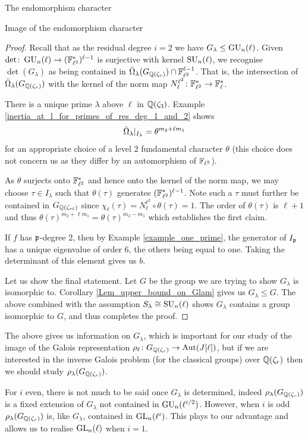 \documentclass[11pt,a4paper]{article}
\newcommand{\Fl}{\mathbb{F}_\ell}
\newcommand{\Qr}{{\QQ(\zeta_r)}}
\newcommand{\GQr}{G_{\QQ(\zeta_{r})}}
\newcommand{\GQrl}{G_{\QQ(\zeta_{r\ell})}}
\newcommand{\Glam}{G_{\lambda}}
\newcommand{\Slam}{S_{\lambda}}
\begin{document}
\begin{section}{The endomorphism character}
\begin{subsection}{Image of the endomorphism character}
\begin{proof}
Recall that as the residual degree $i=2$ we have $\Glam \leq \GU_{n}(\ell)$.
Given $\det \colon \GU_{n}(\ell) \rightarrow (\FF_{\ell^2}^*)^{\ell-1}$ is surjective with kernel $\SU_n(\ell)$, we recognise $\det(\Glam)$ as being contained in $\Bar{\Omega}_\lambda(\GQr)\cap \FF_{\ell^2}^{\ell-1}$.
That is, the intersection of $\Bar{\Omega}_\lambda(\GQr)$ with the kernel of the norm map $N^{\ell^2}_\ell\colon \FF_{\ell^2}^* \rightarrow \Fl^*$.  

There is a unique prime $\lambda$ above $\ell$ in $\mathbb{Q}(\zeta_3)$. Example \ref{inertia_at_l_for_primes_of_res_deg_1_and_2} shows
\[
\Bar{\Omega}_\lambda|_{I_{\lambda}} = \theta^{m_{2} + \ell m_1 }
\]
for an appropriate choice of a level 2 fundamental character $\theta$ (this choice does not concern us as they differ by an automorphism of $\mathbb{F}_{\ell^2}$).

 As $\theta$ surjects onto $\mathbb{F}_{\ell^2}^*$  and hence onto the kernel of the norm map, we may choose $\tau \in I_\lambda$ such that $\theta(\tau)$ generates $(\mathbb{F}_{\ell^2}^*)^{\ell-1}$. Note such a $\tau$ must further be contained in $\GQrl$ since $\chi_\ell(\tau) = N^{\ell^2}_{\ell} \circ \theta(\tau) =1$.  
 The order of $\theta(\tau)$ is $\ell+1$ and thus $\theta(\tau)^{m_{2} + \ell m_1} = \theta(\tau)^{m_{2} - m_1} $ which establishes the first claim.
 
If $f$ has $\mathfrak{p}$-degree 2, then by Example \ref{example_one_prime}, the generator of $I_{\mathfrak{p}}$ has a unique eigenvalue of order $6$, the others being equal to one. Taking the determinant of this element gives us $b$. 

Let us show the final statement. Let $G$ be the group we are trying to show $\Glam$ is isomorphic to. Corollary \ref{Lem_upper_bound_on_Glam} gives us $\Glam \leq G$. The above combined with the assumption $\Slam \cong \SU_n(\ell)$ shows $\Glam$ contains a group isomorphic to $G$, and thus completes the proof.
\end{proof}

The above gives us information on $\Glam$, which is important for our study of the image of the Galois representation $\rho_\ell\colon \GQr \rightarrow \Aut(J[\ell])$, but if we are interested in the inverse Galois problem (for the classical groups) over $\Qr$ then we should study $\rho_\lambda(\GQr)$.

For $i$ even, there is not much to be said once $\Glam$ is determined, indeed $\rho_\lambda(\GQr)$ is a fixed extension of $\Glam$ not contained in $\GU_n(\ell^{i/2})$.
However, when $i$ is odd $\rho_\lambda(\GQr) $ is, like $\Glam$, contained in $\GL_n(\ell^i)$. 
This plays to our advantage and allows us to realise $\GL_n(\ell)$ when $i=1$. 


\end{subsection}
\end{section}
\end{document}
